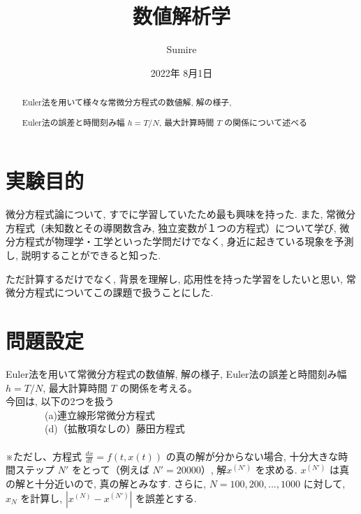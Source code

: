 \documentclass[11pt]{jsarticle}
\begin{document}
\title{数値解析学}
\author{Sumire}
\date{2022年 8月1日}
\maketitle

\begin{abstract}
\centerline{Euler法を用いて様々な常微分方程式の数値解, 解の様子, }
\centerline{Euler法の誤差と時間刻み幅 $h = T / N$, 最大計算時間 $T$ の関係について述べる}
\end{abstract}

\clearpage
\tableofcontents

\clearpage
\listoftables
\listoffigures

\clearpage



\section{実験目的}
微分方程式論について, すでに学習していたため最も興味を持った. また, 常微分方程式（未知数とその導関数含み, 独立変数が１つの方程式）について学び, 微分方程式が物理学・工学といった学問だけでなく, 身近に起きている現象を予測し, 説明することができると知った. \par
ただ計算するだけでなく, 背景を理解し, 応用性を持った学習をしたいと思い, 常微分方程式についてこの課題で扱うことにした. 




\section{問題設定}
Euler法を用いて常微分方程式の数値解, 解の様子, Euler法の誤差と時間刻み幅 $h = T / N$, 最大計算時間 $T$ の関係を考える。\\
今回は, 以下の2つを扱う\\
\ \ \ \ \ \ \ \ (a)連立線形常微分方程式\\
\ \ \ \ \ \ \ \ (d)（拡散項なしの）藤田方程式\\
\\
※ただし、方程式 $\frac{dx}{dt} = f(t, x(t))$ の真の解が分からない場合, 十分大きな時間ステップ $N'$ をとって（例えば $N' = 20000$）, 解$x^{(N')}$ を求める. $x^{(N')}$ は真の解と十分近いので, 真の解とみなす. さらに, $N = 100, 200, ..., 1000$ に対して, $x_{N}$ を計算し, $|x^{(N)} - x^{(N')}|$ を誤差とする. 
\end{document}
